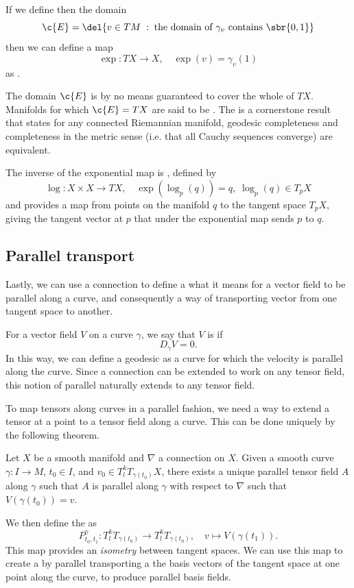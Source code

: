 If we define then the domain
\[\c{E} = \del{v\in TM \;:\; \text{the domain of }\gamma_v \text{ contains } \sbr{0,1}}\]
then we can define a map
\[\exp: TX \to X, \quad \exp(v) = \gamma_v(1)\]
as .

The domain \(\c{E}\) is by no means guaranteed to cover the whole of \(TX\).
Manifolds for which \(\c{E} = TX\) are said to be .
The  is a cornerstone result that states for any connected Riemannian manifold, geodesic completeness and completeness in the metric sense (i.e. that all Cauchy sequences converge) are equivalent.

The inverse of the exponential map is , defined by
\[
	\log: X\times X \to TX, \quad \exp(\log_p(q)) = q,\; \log_p(q) \in T_pX	
\]
and provides a map from points on the manifold \(q\) to the tangent space \(T_pX\), giving the tangent vector at \(p\) that under the exponential map sends \(p\) to \(q\).

\subsection{Parallel transport}
\label{def:parallel_transport}
Lastly, we can use a connection to define a what it means for a vector field to be parallel along a curve, and consequently a way of transporting vector from one tangent space to another.

For a vector field \(V\) on a curve \(\gamma\), we say that \(V\) is  if \[D_\gamma V = 0.\]
In this way, we can define a geodesic as a curve for which the velocity is parallel along the curve.
Since a connection can be extended to work on any tensor field, this notion of parallel naturally extends to any tensor field.

To map tensors along curves in a parallel fashion, we need a way to extend a tensor at a point to a tensor field along a curve.
This can be done uniquely by the following theorem.
\begin{theorem}
	Let \(X\) be a smooth manifold and \(\nabla\) a connection on \(X\).
	Given a smooth curve \(\gamma: I \to M\), \( t_0\in I\), and \(v_0 \in T^k_l T_{\gamma(t_0)}X\), there exists a unique parallel tensor field \(A\) along \(\gamma\) such that \(A\) is parallel along \(\gamma\) with respect to \(\nabla\) such that \(V(\gamma(t_0)) = v\).
\end{theorem}
We then define the  as 
\[P_{t_0, t_1}^\gamma: T^k_lT_{\gamma(t_0)} \to T^k_lT_{\gamma(t_0)}, \quad v \mapsto V(\gamma(t_1)).\]
This map provides an \emph{isometry} between tangent spaces.
We can use this map to create a  by parallel transporting a the basis vectors of the tangent space at one point along the curve, to produce parallel basis fields.


